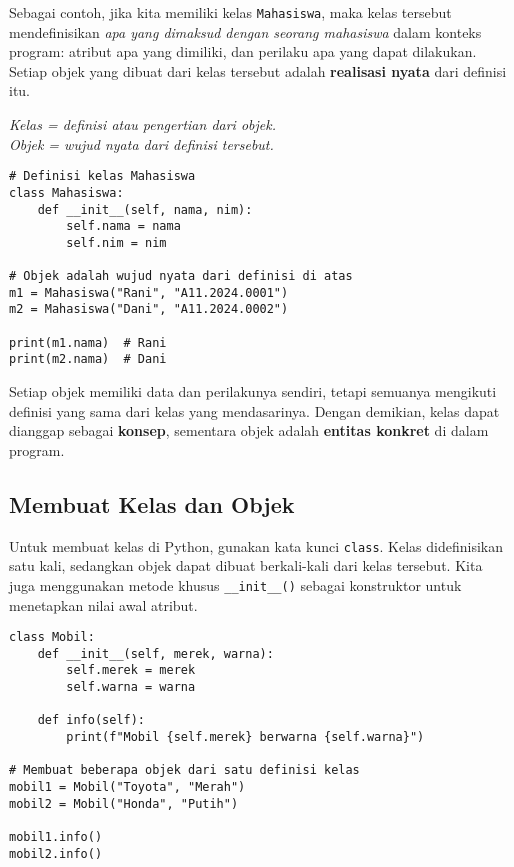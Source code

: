 Sebagai contoh, jika kita memiliki kelas \texttt{Mahasiswa}, maka kelas tersebut mendefinisikan \emph{apa yang dimaksud dengan seorang mahasiswa} dalam konteks program: atribut apa yang dimiliki, dan perilaku apa yang dapat dilakukan.  
Setiap objek yang dibuat dari kelas tersebut adalah \textbf{realisasi nyata} dari definisi itu.

\begin{center}
\textit{Kelas = definisi atau pengertian dari objek.} \\
\textit{Objek = wujud nyata dari definisi tersebut.}
\end{center}

\begin{lstlisting}[style=PythonStyle, caption={Kelas sebagai Definisi Objek}]
# Definisi kelas Mahasiswa
class Mahasiswa:
    def __init__(self, nama, nim):
        self.nama = nama
        self.nim = nim

# Objek adalah wujud nyata dari definisi di atas
m1 = Mahasiswa("Rani", "A11.2024.0001")
m2 = Mahasiswa("Dani", "A11.2024.0002")

print(m1.nama)  # Rani
print(m2.nama)  # Dani
\end{lstlisting}

Setiap objek memiliki data dan perilakunya sendiri, tetapi semuanya mengikuti definisi yang sama dari kelas yang mendasarinya.  
Dengan demikian, kelas dapat dianggap sebagai \textbf{konsep}, sementara objek adalah \textbf{entitas konkret} di dalam program.

\subsection{Membuat Kelas dan Objek}
Untuk membuat kelas di Python, gunakan kata kunci \texttt{class}. Kelas didefinisikan satu kali, sedangkan objek dapat dibuat berkali-kali dari kelas tersebut.  
Kita juga menggunakan metode khusus \texttt{__init__()} sebagai konstruktor untuk menetapkan nilai awal atribut.

\begin{lstlisting}[style=PythonStyle, caption={Membuat Kelas dan Objek}]
class Mobil:
    def __init__(self, merek, warna):
        self.merek = merek
        self.warna = warna

    def info(self):
        print(f"Mobil {self.merek} berwarna {self.warna}")

# Membuat beberapa objek dari satu definisi kelas
mobil1 = Mobil("Toyota", "Merah")
mobil2 = Mobil("Honda", "Putih")

mobil1.info()
mobil2.info()
\end{lstlisting}

